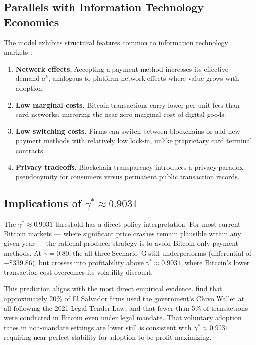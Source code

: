 \documentclass{article}
\begin{document}
\subsection{Parallels with Information Technology Economics}

The model exhibits structural features common to information technology markets
\citep{shapiro1998}:

\begin{enumerate}
  \item \textbf{Network effects.}
        Accepting a payment method increases its effective demand $a^k$, analogous
        to platform network effects where value grows with adoption.
  \item \textbf{Low marginal costs.}
        Bitcoin transactions carry lower per-unit fees than card networks,
        mirroring the near-zero marginal cost of digital goods.
  \item \textbf{Low switching costs.}
        Firms can switch between blockchains or add new payment methods with
        relatively low lock-in, unlike proprietary card terminal contracts.
  \item \textbf{Privacy tradeoffs.}
        Blockchain transparency introduces a privacy paradox: pseudonymity for
        consumers versus permanent public transaction records.
\end{enumerate}

\subsection{Implications of $\gamma^* \approx 0.9031$}

The $\gamma^* \approx 0.9031$ threshold has a direct policy interpretation.
For most current Bitcoin markets --- where significant price crashes remain
plausible within any given year --- the rational producer strategy is to avoid
Bitcoin-only payment methods.
At $\gamma = 0.80$, the all-three Scenario~G still underperforms
(differential of $-\$339.86$), but crosses into profitability above
$\gamma^* \approx 0.9031$, where Bitcoin's lower transaction cost overcomes
its volatility discount.

This prediction aligns with the most direct empirical evidence.
\citet{alvarez2023} find that approximately 20\% of El Salvador firms used the
government's Chivo Wallet at all following the 2021 Legal Tender Law, and that
fewer than 5\% of transactions were conducted in Bitcoin even under legal
mandate.
That voluntary adoption rates in non-mandate settings are lower still is
consistent with $\gamma^* \approx 0.9031$ requiring near-perfect stability for
adoption to be profit-maximizing.
\end{document}
